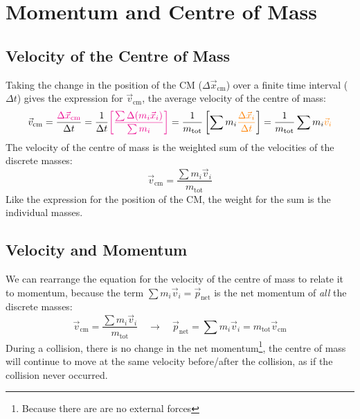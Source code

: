 %
%
%
\section{Momentum and Centre of Mass}

\subsection{Velocity of the Centre of Mass}
Taking the change in the position of the CM ($\Delta\vec x_\text{cm}$) over a
finite time interval ($\Delta t$) gives the expression for $\vec v_\text{cm}$,
the average velocity of the centre of mass:
\begin{equation*}
  \vec v_\text{cm}
  =\frac{\color{magenta}\Delta\vec x_\text{cm}}{\Delta t}
  =\frac1{\Delta t}
  {\color{magenta}\left[\frac{\sum\Delta(m_i\vec x_i)}{\sum m_i}\right]}
  =\frac1{m_\text{tot}}
  \left[\sum m_i{\color{orange}\frac{\Delta\vec x_i}{\Delta t}}\right]
  =\frac1{m_\text{tot}}\sum m_i{\color{orange}\vec v_i}
\end{equation*}
The velocity of the centre of mass is the weighted sum of the velocities of
the discrete masses:
\begin{equation}
  \vec v_\text{cm} = \frac{\sum m_i\vec v_i}{m_\text{tot}}
\end{equation}
Like the expression for the position of the CM, the weight for the sum is the
individual masses.


\subsection{Velocity and Momentum}
We can rearrange the equation for the velocity of the centre of mass to relate
it to momentum, because the term $\sum m_i\vec v_i=\vec p_\text{net}$ is the net
momentum of \emph{all} the discrete masses:
\begin{equation}
  \vec v_\text{cm} = \frac{\sum m_i\vec v_i}{m_\text{tot}}
  \quad\longrightarrow\quad
  \vec p_\text{net}= \sum m_i\vec v_i = m_\text{tot}\vec v_\text{cm}
\end{equation}
During a collision, there is no change in the net momentum\footnote{Because
there are are no external forces}, the centre of mass will continue to move at
the same velocity before/after the collision, as if the collision never
occurred.

